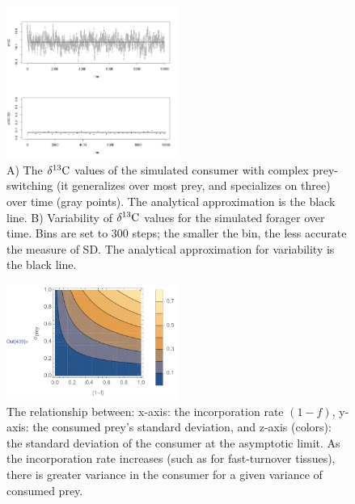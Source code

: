 \documentclass[11pt]{article}
\begin{document}
\begin{figure}[h!]
   \centering
   \includegraphics[width=0.5\textwidth]{fig_d13CvsTime_gen.png}
      \caption{
      A) The $\delta^{13}{\rm C}$ values of the simulated consumer with complex prey-switching (it generalizes over most prey, and specializes on three) over time (gray points). The analytical approximation is the black line.
      B) Variability of $\delta^{13}{\rm C}$ values for the simulated forager over time. Bins are set to 300 steps; the smaller the bin, the less accurate the measure of SD. The analytical approximation for variability is the black line.
      }
      \label{fig_time}
\end{figure}

\begin{figure}[h!]
   \centering
   \includegraphics[width=0.5\textwidth]{fig_fvsSigma.pdf}
      \caption{
      The relationship between: x-axis: the incorporation rate $(1-f)$, y-axis: the consumed prey's standard deviation, and z-axis (colors): the standard deviation of the consumer at the asymptotic limit.
      As the incorporation rate increases (such as for fast-turnover tissues), there is greater variance in the consumer for a given variance of consumed prey.
      }
      \label{fig_time}
\end{figure}
\end{document}
